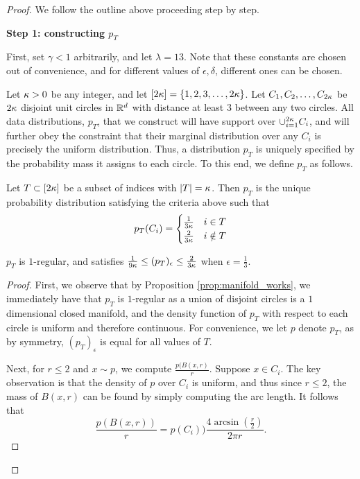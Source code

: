 \begin{proof}
We follow the outline above proceeding step by step. 

\textbf{Step 1: constructing $p_T$}

First, set $\gamma < 1$ arbitrarily, and let $\lambda = 13$. Note that these constants are chosen out of convenience, and for different values of $\epsilon, \delta$, different ones can be chosen. 

Let $\kappa > 0$ be any integer, and let $[2\kappa] = \{1, 2, 3, \dots, 2\kappa\}$. Let $C_1, C_2, \dots, C_{2\kappa}$ be $2\kappa$ disjoint unit circles in $\mathbb{R}^d$ with distance at least $3$ between any two circles. All data distributions, $p_T$, that we construct will have support over $\cup_{i = 1}^{2\kappa} C_i$, and will further obey the constraint that their marginal distribution over any $C_i$ is precisely the uniform distribution. Thus, a distribution $p_T$ is uniquely specified by the probability mass it assigns to each circle. To this end, we define $p_T$ as follows. 

\begin{definition}
Let $T \subset [2\kappa]$ be a subset of indices with $|T| = \kappa$. Then $p_T$ is the unique probability distribution satisfying the criteria above such that $$p_T(C_i) = \begin{cases} \frac{1}{3\kappa} & i \in T \\ \frac{2}{3\kappa} & i \notin T \end{cases}$$
\end{definition}

\begin{lemma}\label{lem:p_T_is_regular}
$p_T$ is $1$-regular, and satisfies $\frac{1}{9\kappa} \leq (p_T)_\epsilon \leq \frac{2}{3\kappa}$ when $\epsilon = \frac{1}{3}$. 
\end{lemma}

\begin{proof}
First, we observe that by Proposition \ref{prop:manifold_works}, we immediately have that $p_T$ is $1$-regular as a union of disjoint circles is a $1$ dimensional closed manifold, and the density function of $p_T$ with respect to each circle is uniform and therefore continuous. For convenience, we let $p$ denote $p_T$, as by symmetry, $(p_T)_\epsilon$ is equal for all values of $T$. 

Next, for $r \leq 2$ and $x \sim p$, we compute $\frac{p(B(x, r)}{r}$. Suppose $x \in C_i$. The key observation is that the density of $p$ over $C_i$ is uniform, and thus since $r \leq 2$, the mass of $B(x, r)$ can be found by simply computing the arc length. It follows that \begin{equation}\label{eqn:ball_mass}\frac{p(B(x, r))}{r} = p(C_i))\frac{4\arcsin(\frac{r}{2})}{2\pi r}.\end{equation} 


\end{proof}
\end{proof}
